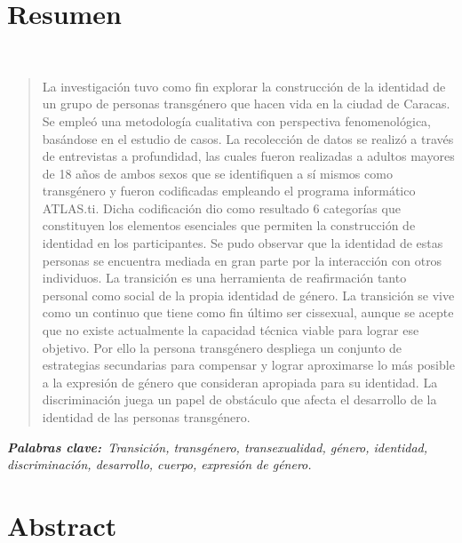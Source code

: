 %

\chapter{Resumen}
\begin{center}
	\large\scshape\thetitle\
\end{center}

\begin{quote}
\small
La investigación tuvo como fin explorar la construcción de la identidad de un
grupo de personas transgénero que hacen vida en la ciudad de Caracas. Se empleó
una metodología cualitativa con perspectiva fenomenológica, basándose en el
estudio de casos. La recolección de datos se realizó a través de entrevistas a
profundidad, las cuales fueron realizadas a adultos mayores de 18 años de ambos
sexos que se identifiquen a sí mismos como transgénero y fueron codificadas
empleando el programa informático ATLAS.ti\@. Dicha codificación dio como
resultado 6 categorías que constituyen los elementos esenciales que permiten la
construcción de identidad en los participantes. Se pudo observar que la
identidad de estas personas se encuentra mediada en gran parte por la
interacción con otros individuos. La transición es una herramienta de
reafirmación tanto personal como social de la propia identidad de género. La
transición se vive como un continuo que tiene como fin último ser cissexual,
aunque se acepte que no existe actualmente la capacidad técnica viable para
lograr ese objetivo. Por ello la persona transgénero despliega un conjunto de
estrategias secundarias para compensar y lograr aproximarse lo más posible a la
expresión de género que consideran apropiada para su identidad. La
discriminación juega un papel de obstáculo que afecta el desarrollo de la
identidad de las personas transgénero.
\end{quote}

\itshape\textbf{Palabras clave:}\normalfont{}\ Transición, transgénero,
transexualidad, género, identidad, discriminación, desarrollo, cuerpo,
expresión de género.

\chapter{Abstract}

